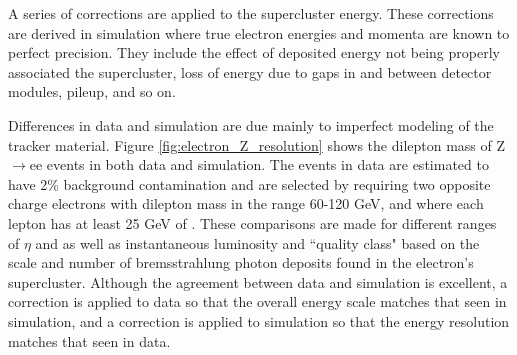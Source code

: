     A series of corrections are applied to the supercluster energy. These corrections are derived in simulation where true electron energies and momenta are known to perfect precision. They include the effect of deposited energy not being properly associated the supercluster, loss of energy due to gaps in and between detector modules, pileup, and so on.\cite[sec 4.8]{Electron_reco} 

    Differences in data and simulation are due mainly to imperfect modeling of the tracker material. Figure \ref{fig:electron_Z_resolution} shows the dilepton mass of Z$\to$ee events in both data and simulation. The events in data are estimated to have 2\% background contamination\cite[sec. 4.5.1]{ecal_energy_reco} and are selected by requiring two opposite charge electrons with dilepton mass in the range 60-120 GeV, and where each lepton has at least 25 GeV of \pt. These comparisons are made for different ranges of $\eta$ and \pt as well as instantaneous luminosity and ``quality class" based on the scale and number of bremsstrahlung photon deposits found in the electron's supercluster. Although the agreement between data and simulation is excellent, a correction is applied to data so that the overall energy scale matches that seen in simulation, and a correction is applied to simulation so that the energy resolution matches that seen in data. 

